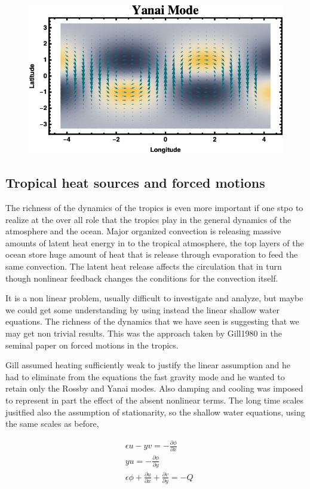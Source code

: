 \begin{figure}
\centering
\includegraphics[width = .7 \textwidth]{figs/GD/YanaiWave.png}
\caption{}
\end{figure}

\subsection{Tropical heat sources and forced
motions}\label{tropical-heat-sources-and-forced-motions}

The richness of the dynamics of the tropics is even more important if
one stpo to realize at the over all role that the tropics play in the
general dynamics of the atmosphere and the ocean. Major organized
convection is releasing massive amounts of latent heat energy in to the
tropical atmosphere, the top layers of the ocean store huge amount of
heat that is release through evaporation to feed the same convection.
The latent heat release affects the circulation that in turn though
nonlinear feedback changes the conditions for the convection itself.

It is a non linear problem, usually difficult to investigate and
analyze, but maybe we could get some understanding by using instead the
linear shallow water equations. The richness of the dynamics that we
have seen is suggesting that we may get non trivial results. This was
the approach taken by Gill1980 in the seminal paper on forced motions in
the tropics.

Gill assumed heating sufficiently weak to justify the linear assumption
and he had to eliminate from the equations the fast gravity mode and he
wanted to retain only the Rossby and Yanai modes. Also damping and
cooling was imposed to represent in part the effect of the absent
nonlinear terms. The long time scales jusitfied also the assumption of
stationarity, so the shallow water equations, using the same scales as
before,

\[\begin{aligned}
&\epsilon u - y v = -\frac{\partial \phi}{\partial x}\\
& y u = - \frac{\partial \phi}{\partial y}\\
&\epsilon\phi +\frac{\partial u}{\partial x}+\frac{\partial v}{\partial y} = - Q
\end{aligned}\]

